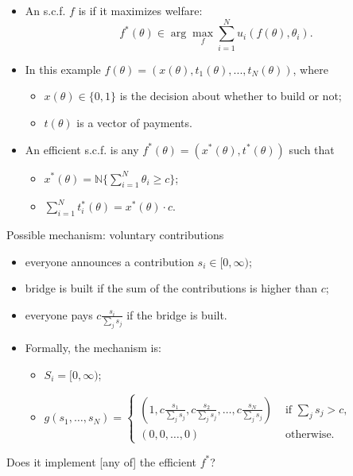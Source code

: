\documentclass[english]{beamer}		%
\def\lyxframeend{} %
\begin{document}
\begin{itemize}
	\item An s.c.f. $f$ is  if it maximizes welfare:
	$$f^*(\theta) \in \arg \max_{f} \sum_{i=1}^{N} u_i(f(\theta),\theta_i).$$
	\pause
	\item In this example $f(\theta) = (x(\theta), t_1(\theta), ..., t_N(\theta))$, where
	\begin{itemize}
		\item $x(\theta) \in \{0,1\}$ is the decision about whether to build or not;
		\item $t(\theta)$ is a vector of payments.
	\end{itemize}
	\item An efficient s.c.f. is any $f^*(\theta)=(x^*(\theta),t^*(\theta))$ such that 
	\begin{itemize}
		\item $x^*(\theta) = \mathbb{N} \{ \sum_{i=1}^{N} \theta_i \geq c \}$;
		\item $\sum_{i=1}^{N} t^*_i(\theta) = x^*(\theta) \cdot c$.
	\end{itemize}
\end{itemize}
\lyxframeend


\begin{exampleblock}{Possible mechanism: voluntary contributions}
	\begin{itemize}
		\item everyone announces a contribution $s_{i}\in[0,\infty)$;
		\item bridge is built if the sum of the contributions is higher than $c$;
		\item everyone pays $c\frac{s_{i}}{\sum_{j}s_{j}}$ if the bridge is built.
		\pause
		\item Formally, the mechanism is:
		\begin{itemize}
			\item $S_{i}= [0,\infty)$;
			\item $g(s_{1},\dots,s_{N})=
			\begin{cases}
				\left(1,c\frac{s_{1}}{\sum_{j}s_{j}},c\frac{s_{2}}{\sum_{j}s_{j}},\dots,c\frac{s_{N}}{\sum_{j}s_{j}}\right) &\text{ if } \sum_{j}s_{j}>c, \\
				(0,0,\dots,0) &\text{ otherwise.}
			\end{cases}
			$
		\end{itemize}
	\end{itemize}
\end{exampleblock}
\pause
Does it implement [any of] the efficient $f^*$?
\lyxframeend
\end{document}
